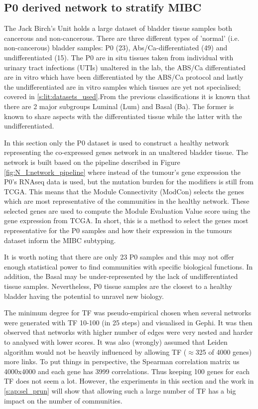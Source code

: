 

\subsection{P0 derived network to stratify MIBC} \label{s:p0}

 
The Jack Birch's Unit holds a large dataset of bladder tissue samples both cancerous and non-cancerous. There are three different types of 'normal'  (i.e. non-cancerous) bladder samples: P0 (23), Abs/Ca-differentiated (49) and undifferentiated (15). The P0 are in situ tissues taken from individual with urinary tract infections (UTIs) unaltered in the lab, the ABS/Ca differentiated are in vitro which have been differentiated by the ABS/Ca protocol and lastly the undifferentiated are in vitro samples which tissues are yet not specialised; covered in \cref{s:lit:datasets_used}.From the previous classifications \citet{Robertson2017-mg, Kamoun2020-tj} it is known that there are 2 major subgroups Luminal (Lum) and Basal (Ba). The former is known to share aspects with the differentiated tissue while the latter with the undifferentiated. 

In this section only the P0 dataset is used to construct a healthy network representing the co-expressed genes network in an unaltered bladder tissue. The network is built based on the pipeline described in Figure \ref{fig:N_I:network_pipeline} where instead of the tumour's gene expression the P0's RNAseq data is used, but the mutation burden for the modifiers is still from TCGA. This means that the Module Connectivity (ModCon) selects the genes which are most representative of the communities in the healthy network. These selected genes are used to compute the Module Evaluation Value score using the gene expression from TCGA. In short, this is a method to select the genes most representative for the P0 samples and how their expression in the tumours dataset inform the MIBC subtyping. 

It is worth noting that there are only 23 P0 samples and this may not offer enough statistical power to find communities with specific biological functions. In addition, the Basal may be under-represented by the lack of undifferentiated tissue samples. Nevertheless, P0 tissue samples are the closest to a healthy bladder having the potential to unravel new biology.

The minimum degree for TF was pseudo-empirical chosen when several networks were generated with TF 10-100 (in 25 steps) and visualised in Gephi. It was then observed that networks with higher number of edges were very nested and harder to analysed with lower scores. It was also (wrongly) assumed that Leiden algorithm would not be heavily influenced by allowing TF ($\approx$325 of 4000 genes) more links. To put things in perspective, the Spearman correlation matrix us 4000x4000 and each gene has 3999 correlations. Thus keeping 100 genes for each TF does not seem a lot. However, the experiments in this section and the work in \cref{s:ap:sel_prun} will show that allowing such a large number of TF has a big impact on the number of communities.

